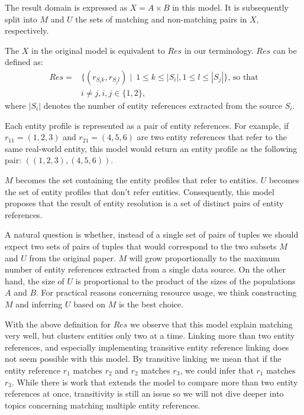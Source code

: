 The result domain is expressed as $X = A \times B$ in this model.
It is subsequently split into $M$ and $U$ the sets of matching and
non-matching pairs in $X$, respectively.

The $X$ in the original model is equivalent to $Res$ in our terminology.
$Res$ can be defined as:
\begin{align}
    Res = &\{(r_{{S_i}{k}}, r_{{S_j}{l}})\mid~1 \leq k \leq |S_i|,
    1 \leq l \leq |S_j|\}\textrm{, so that}\nonumber\\
    &i \neq j, i,j \in \{1, 2\}\textrm{,}\nonumber
\end{align}
where $|S_i|$ denotes the number of entity references extracted from the
source $S_i$.

Each entity profile is represented as a pair of entity references.
For example, if $r_{11}=(1, 2, 3)$ and $r_{21}=(4, 5, 6)$ are two entity
references that refer to the same real-world entity, this model would return
an entity profile as the following pair: $((1, 2, 3), (4, 5, 6))$.

$M$ becomes the set containing the entity profiles that refer to entities.
$U$ becomes the set of entity profiles that don't refer entities.
Consequently, this model proposes that the result of entity resolution is a
set of distinct pairs of entity references.

A natural question is whether, instead of a single set of pairs of tuples we
should expect two sets of pairs of tuples that would correspond to the two
subsets $M$ and $U$ from the original paper.
$M$ will grow proportionally to the maximum number of entity references
extracted from a single data source.
On the other hand, the size of $U$ is proportional to the product of the
sizes of the populations $A$ and $B$.
For practical reasons concerning resource usage, we think constructing $M$
and inferring $U$ based on $M$ is the best choice.

With the above definition for $Res$ we observe that this model explain
matching very well, but clusters entities only two at a time.
Linking more than two entity references, and especially implementing
transitive entity reference linking does not seem possible with this
model\cite{Tal11}.
By transitive linking we mean that if the entity reference $r_1$ matches
$r_2$ and $r_2$ matches $r_3$, we could infer that $r_1$ matches $r_3$.
While there is work that extends the model to compare more than two entity
references\cite{Kon19} at once, transitivity is still an issue so we will
not dive deeper into topics concerning matching multiple entity references.

